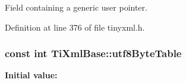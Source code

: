 Field containing a generic user pointer. 



Definition at line 376 of file tinyxml.h.

\hypertarget{class_ti_xml_base_ac8c86058137bdb4b413c3eca58f2d467}{
\subsubsection[{utf8ByteTable}]{\setlength{\rightskip}{0pt plus 5cm}const int {\bf TiXmlBase::utf8ByteTable}}}
\label{class_ti_xml_base_ac8c86058137bdb4b413c3eca58f2d467}
{\bfseries Initial value:}
\begin{DoxyCode}
 
{
        
}
\end{DoxyCode}
